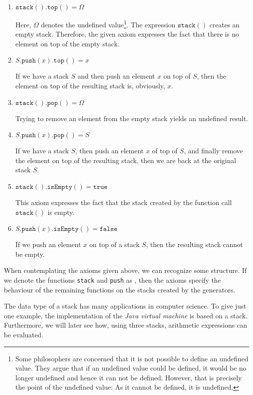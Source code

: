 \begin{enumerate}
\item $\texttt{stack}().\texttt{top}() = \Omega$

      Here, $\Omega$ denotes the undefined value\footnote{
       Some philosophers are concerned that it is not possible to define an undefined value.
       They argue that if an undefined value could be defined, it would be no longer undefined
       and hence it can not be defined.  However, that is precisely the point of the undefined 
       value: As it cannot be defined, it is undefined. \raisebox{-0.1cm}{$\Large\smiley$}}.  
      The expression $\texttt{stack}()$
      creates an empty stack.  Therefore, the given axiom expresses the fact that there is no
      element on top of the empty stack.
\item $S.\texttt{push}(x).\texttt{top}() = x$

      If we have a stack $S$ and then push an element $x$ on top of $S$, then the element on top
      of the resulting stack is, obviously, $x$.
\item $\texttt{stack}().\texttt{pop}() = \Omega$

      Trying to remove an element from the empty stack yields an undefined result.
\item $S.\texttt{push}(x).\texttt{pop}() = S$

      If we have a stack $S$, then push an element $x$ of top of $S$, and finally remove the element
      on top of the resulting stack, then we are back at the original stack $S$.
    
\item $\texttt{stack}().\texttt{isEmpty}() = \mathtt{true}$

      This axiom expresses the fact that the stack created by the function call $\texttt{stack}()$
      is empty.
\item $S.\texttt{push}(x).\texttt{isEmpty}() = \mathtt{false}$

      If we push an element $x$ on top of a stack $S$, then the resulting stack cannot be empty.
\end{enumerate}
When contemplating the axioms given above, we can recognize some structure.  If we denote the
functions \texttt{stack} and \texttt{push} as ,  then the axioms specify the
behaviour of the remaining functions on the stacks created by the generators.

The data type of a stack has many applications in computer science.  To give just one example, the
implementation of the \textsl{Java virtual machine} is based on a stack.  Furthermore,  we will
later see how,  using three stacks, arithmetic expressions can be evaluated.



